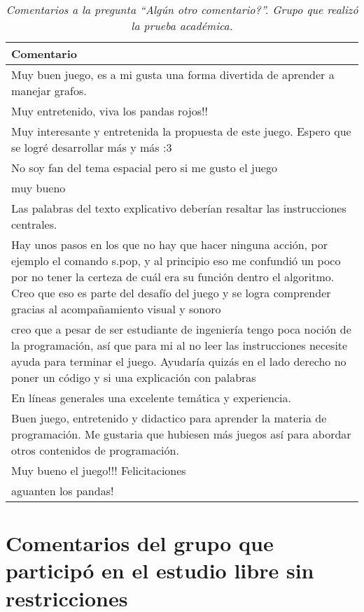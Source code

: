 \begin{table}[h]
   \centering
   \caption*{\textit{Comentarios a la pregunta ``Algún otro comentario?''. Grupo que realizó la prueba académica.}}
   \begin{tabular}{|p{\linewidth}|}
   \hline
   \textbf{Comentario} \\\hline
   Muy buen juego, es a mi gusta una forma divertida de aprender a manejar grafos. \\ \hline
   Muy entretenido, viva los pandas rojos!! \\ \hline
   Muy interesante y entretenida la propuesta de este juego. Espero que se logré desarrollar más y más :3 \\ \hline
   No soy fan del tema espacial pero si me gusto el juego \\ \hline
   muy bueno \\ \hline
   Las palabras del texto explicativo deberían resaltar las instrucciones centrales. \\ \hline
   Hay unos pasos en los que no hay que hacer ninguna acción, por ejemplo el comando s.pop, y al principio eso me confundió un poco por no tener la certeza de cuál era su función dentro el algoritmo. Creo que eso es parte del desafío del juego y se logra comprender gracias al acompañamiento visual y sonoro \\ \hline
   creo que a pesar de ser estudiante de ingeniería  tengo poca noción de la programación, así que para mi al no leer las instrucciones necesite ayuda para terminar el juego. Ayudaría quizás en el lado derecho no poner un código y si una explicación con palabras \\ \hline
   En líneas generales una excelente temática y experiencia. \\ \hline
   Buen juego, entretenido y didactico para aprender la materia de programación. Me gustaria que hubiesen más juegos así para abordar otros contenidos de programación. \\ \hline
   Muy bueno el juego!!! Felicitaciones \\ \hline
   aguanten los pandas! \\ \hline
   \end{tabular}
\end{table}

\restoregeometry





\section*{Comentarios del grupo que participó en el estudio libre sin restricciones}


